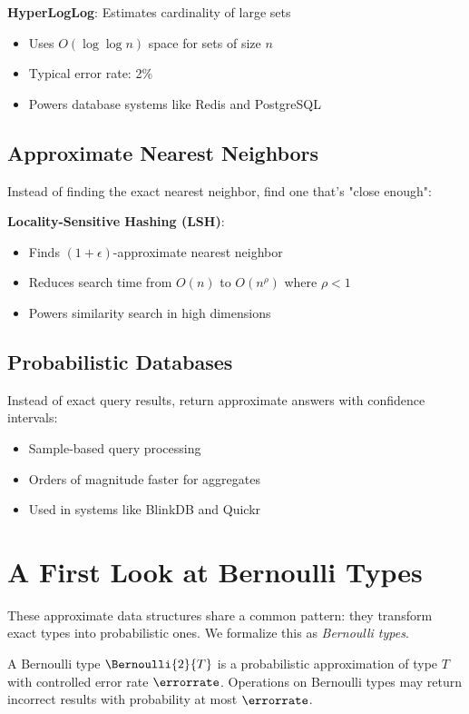 \textbf{HyperLogLog}: Estimates cardinality of large sets
\begin{itemize}
    \item Uses $O(\log \log n)$ space for sets of size $n$
    \item Typical error rate: 2\%
    \item Powers database systems like Redis and PostgreSQL
\end{itemize}

\subsection{Approximate Nearest Neighbors}

Instead of finding the exact nearest neighbor, find one that's "close enough":

\textbf{Locality-Sensitive Hashing (LSH)}:
\begin{itemize}
    \item Finds $(1+\epsilon)$-approximate nearest neighbor
    \item Reduces search time from $O(n)$ to $O(n^{\rho})$ where $\rho < 1$
    \item Powers similarity search in high dimensions
\end{itemize}

\subsection{Probabilistic Databases}

Instead of exact query results, return approximate answers with confidence intervals:
\begin{itemize}
    \item Sample-based query processing
    \item Orders of magnitude faster for aggregates
    \item Used in systems like BlinkDB and Quickr
\end{itemize}

\section{A First Look at Bernoulli Types}

These approximate data structures share a common pattern: they transform exact types into probabilistic ones. We formalize this as \emph{Bernoulli types}.

\begin{definition}
A Bernoulli type $\Bernoulli{2}{T}$ is a probabilistic approximation of type $T$ with controlled error rate $\errorrate$. Operations on Bernoulli types may return incorrect results with probability at most $\errorrate$.
\end{definition}

